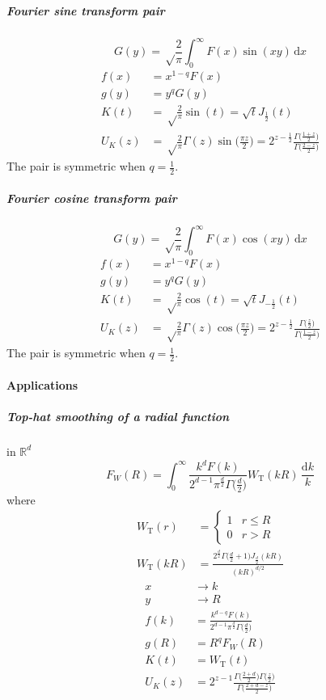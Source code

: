 \documentclass{article}
\renewcommand{\d}{\mathrm{d}}
\newcommand{\Mellin}{U}
\newcommand{\Tophat}{\mathrm{T}}
\begin{document}
\subparagraph{Fourier sine transform pair}
\begin{equation}
    G(y) = \sqrt\frac2\pi \int_0^\infty F(x) \sin(xy) \,\d x
\end{equation}
\begin{align}
    f(x) &= x^{1-q} F(x) \\
    g(y) &= y^q G(y) \\
    K(t) &= \sqrt\frac2\pi \sin(t) = \sqrt t J_\frac12(t) \\
    \Mellin_K(z) &= \sqrt\frac2\pi \Gamma(z) \sin\bigl(\frac{\pi z}2\bigr)
    = 2^{z-\frac12} \frac{\Gamma\bigl(\frac{1+z}2\bigr)}{\Gamma\bigl(\frac{2-z}2\bigr)}
\end{align}
The pair is symmetric when $q=\frac12$.


\subparagraph{Fourier cosine transform pair}
\begin{equation}
    G(y) = \sqrt\frac2\pi \int_0^\infty F(x) \cos(xy) \,\d x
\end{equation}
\begin{align}
    f(x) &= x^{1-q} F(x) \\
    g(y) &= y^q G(y) \\
    K(t) &= \sqrt\frac2\pi \cos(t) = \sqrt t J_{-\frac12}(t) \\
    \Mellin_K(z) &= \sqrt\frac2\pi \Gamma(z) \cos\bigl(\frac{\pi z}2\bigr)
    = 2^{z-\frac12} \frac{\Gamma\bigl(\frac{z}2\bigr)}{\Gamma\bigl(\frac{1-z}2\bigr)}
\end{align}
The pair is symmetric when $q=\frac12$.


\paragraph{Applications}


\subparagraph{Top-hat smoothing of a radial function}
in $\mathbb{R}^d$
\begin{equation}
    F_W(R) = \int_0^\infty \frac{k^d F(k)}{2^{d-1}\pi^\frac{d}2\Gamma\bigl(\frac{d}2\bigr)}
                    W_\Tophat(kR) \,\frac{\d k}k
\end{equation}
where
\begin{align}
    W_\Tophat(r) &= \begin{cases}
        1 & r\leq R \\
        0 & r > R
    \end{cases} \\
    W_\Tophat(kR) &= \frac{2^\frac{d}2\Gamma\bigl(\frac{d}2+1\bigr)J_\frac{d}2(kR)}{(kR)^{d/2}}
\end{align}
\begin{align}
    x &\to k \\
    y &\to R \\
    f(k) &= \frac{k^{d-q}F(k)}{2^{d-1}\pi^\frac{d}2\Gamma\bigl(\frac{d}2\bigr)} \\
    g(R) &= R^q F_W(R) \\
    K(t) &= W_\Tophat(t) \\
    \Mellin_K(z) &= 2^{z-1} \frac{\Gamma\bigl(\frac{2+d}2\bigr)\Gamma\bigl(\frac{z}2\bigr)}
                        {\Gamma\bigl(\frac{2+d-z}2\bigr)}
\end{align}
\end{document}
